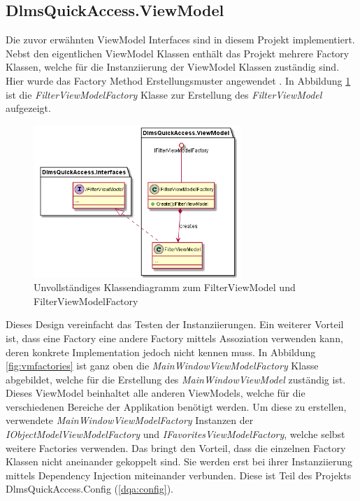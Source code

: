 \subsection{DlmsQuickAccess.ViewModel}
Die zuvor erwähnten ViewModel Interfaces sind in diesem Projekt implementiert.
Nebst den eigentlichen ViewModel Klassen enthält das Projekt mehrere Factory Klassen, welche für die Instanziierung der ViewModel Klassen zuständig sind.
Hier wurde das Factory Method Erstellungsmuster angewendet \parencite{designPatterns}.
In Abbildung \ref{fig:filterViewModel} ist die \textit{FilterViewModelFactory} Klasse zur Erstellung des \textit{FilterViewModel} aufgezeigt.
\begin{figure}[H]
   \centering
   \includegraphics[width=0.7\textwidth]{gfx/Filter ViewModel.png}
   \caption{
      Unvollständiges Klassendiagramm zum FilterViewModel und FilterViewModelFactory
      }
      \label{fig:filterViewModel}
\end{figure}

Dieses Design vereinfacht das Testen der Instanziierungen.
Ein weiterer Vorteil ist, dass eine Factory eine andere Factory mittels Assoziation verwenden kann, deren konkrete Implementation jedoch nicht kennen muss.
In Abbildung \ref{fig:vmfactories} ist ganz oben die \textit{MainWindowViewModelFactory} Klasse abgebildet, welche für die Erstellung des \textit{MainWindowViewModel} zuständig ist.
Dieses ViewModel beinhaltet alle anderen ViewModels, welche für die verschiedenen Bereiche der Applikation benötigt werden.
Um diese zu erstellen, verwendete \textit{MainWindowViewModelFactory} Instanzen der \textit{IObjectModelViewModelFactory} und \textit{IFavoritesViewModelFactory}, welche selbst weitere Factories verwenden.
Das bringt den Vorteil, dass die einzelnen Factory Klassen nicht aneinander gekoppelt sind.
Sie werden erst bei ihrer Instanziierung mittels Dependency Injection miteinander verbunden.
Diese ist Teil des Projekts DlmsQuickAccess.Config (\ref{dqa:config}).
   
